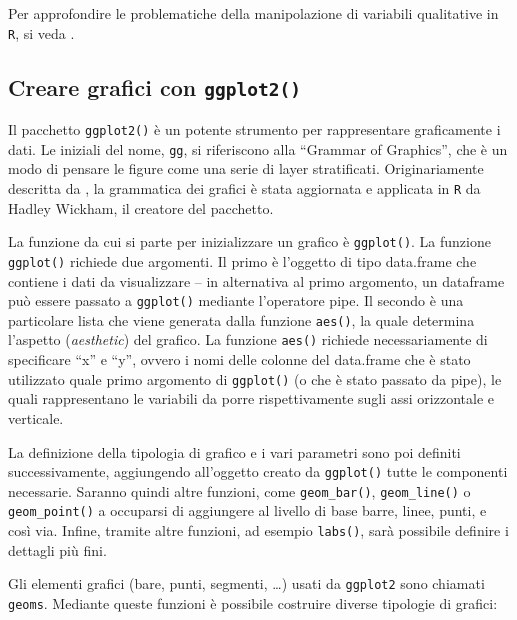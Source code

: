 \documentclass[
  10pt,
  italian,
  a4paper,
  extrafontsizes,onecolumn,openright
  ]{memoir}
\begin{document}
\noindent
Per approfondire le problematiche della manipolazione di variabili qualitative in \texttt{R}, si veda \textcite{mcnamara2018wrangling}.

\hypertarget{creare-grafici-con-ggplot2}{%
\subsection{\texorpdfstring{Creare grafici con \texttt{ggplot2()}}{Creare grafici con ggplot2()}}\label{creare-grafici-con-ggplot2}}

Il pacchetto \texttt{ggplot2()} è un potente strumento per rappresentare graficamente i dati. Le iniziali del nome, \texttt{gg}, si riferiscono alla ``Grammar of Graphics'', che è un modo di pensare le figure come una serie di layer stratificati. Originariamente descritta da \textcite{wilkinson2012grammar}, la grammatica dei grafici è stata aggiornata e applicata in \texttt{R} da Hadley Wickham, il creatore del pacchetto.

La funzione da cui si parte per inizializzare un grafico è \texttt{ggplot()}. La funzione \texttt{ggplot()} richiede due argomenti. Il primo è l'oggetto di tipo data.frame che contiene i dati da visualizzare -- in alternativa al primo argomento, un dataframe può essere passato a \texttt{ggplot()} mediante l'operatore pipe. Il secondo è una particolare lista che viene generata dalla funzione \texttt{aes()}, la quale determina l'aspetto (\emph{aesthetic}) del grafico. La funzione \texttt{aes()} richiede necessariamente di specificare ``x'' e ``y'', ovvero i nomi delle colonne del data.frame che è stato utilizzato quale primo argomento di \texttt{ggplot()} (o che è stato passato da pipe), le quali rappresentano le variabili da porre rispettivamente sugli assi orizzontale e verticale.

La definizione della tipologia di grafico e i vari parametri sono poi definiti successivamente, aggiungendo all'oggetto creato da \texttt{ggplot()} tutte le componenti necessarie. Saranno quindi altre funzioni, come \texttt{geom\_bar()}, \texttt{geom\_line()} o \texttt{geom\_point()} a occuparsi di aggiungere al livello di base barre, linee, punti, e così via. Infine, tramite altre funzioni, ad esempio \texttt{labs()}, sarà possibile definire i dettagli più fini.

Gli elementi grafici (bare, punti, segmenti, \ldots) usati da \texttt{ggplot2} sono chiamati \texttt{geoms}. Mediante queste funzioni è possibile costruire diverse tipologie di grafici:
\end{document}
